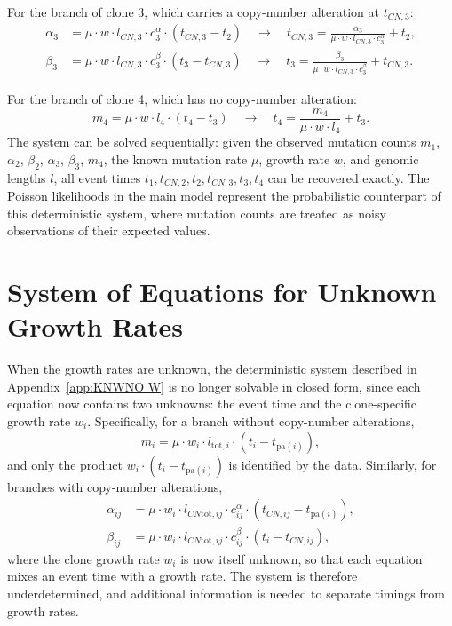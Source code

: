 For the branch of clone 3, which carries a copy-number alteration at $t_{CN,3}$:
%
\begin{align}
    \alpha_3 &= \mu \cdot w \cdot l_{CN,3} \cdot c^\alpha_3 
    \cdot (t_{CN,3} - t_2)
    \quad \longrightarrow \quad
    t_{CN,3} = \frac{\alpha_3}{\mu \cdot w \cdot l_{CN,3} \cdot c^\alpha_3} + t_2, 
    \\[4pt]
    \beta_3 &= \mu \cdot w \cdot l_{CN,3} \cdot c^\beta_3 
    \cdot (t_3 - t_{CN,3})
    \quad \longrightarrow \quad
    t_3 = \frac{\beta_3}{\mu \cdot w \cdot l_{CN,3} \cdot c^\beta_3} + t_{CN,3}.
\end{align}

For the branch of clone 4, which has no copy-number alteration:
%
\begin{equation}
    m_4 = \mu \cdot w \cdot l_4 \cdot (t_4 - t_3)
    \quad \longrightarrow \quad
    t_4 = \frac{m_4}{\mu \cdot w \cdot l_4} + t_3.
\end{equation}
%
The system can be solved sequentially: given the observed mutation counts 
$m_1$, $\alpha_2$, $\beta_2$, $\alpha_3$, $\beta_3$, $m_4$, the known mutation 
rate $\mu$, growth rate $w$, and genomic lengths $l$, all event times 
$t_1, t_{CN,2}, t_2, t_{CN,3}, t_3, t_4$ can be recovered exactly. The Poisson 
likelihoods in the main model represent the probabilistic counterpart of this 
deterministic system, where mutation counts are treated as noisy observations 
of their expected values.

\section{System of Equations for Unknown Growth Rates}
\label{app:RW}
\label{app:randomwalk}

When the growth rates are unknown, the deterministic system described in 
Appendix~\ref{app:KNWNO W} is no longer solvable in closed form, since each 
equation now contains two unknowns: the event time and the clone-specific growth 
rate $w_i$. Specifically, for a branch without copy-number alterations,
%
\begin{equation}
    m_i = \mu \cdot w_i \cdot l_{\mathrm{tot},i} \cdot (t_i - t_{\mathrm{pa}(i)}),
\end{equation}
%
and only the product $w_i \cdot (t_i - t_{\mathrm{pa}(i)})$ is identified by 
the data. Similarly, for branches with copy-number alterations,
%
\begin{align}
    \alpha_{ij} &= \mu \cdot w_i \cdot l_{CN\mathrm{tot},ij}
    \cdot c^\alpha_{ij} \cdot (t_{CN,ij} - t_{\mathrm{pa}(i)}), \\[4pt]
    \beta_{ij} &= \mu \cdot w_i \cdot l_{CN\mathrm{tot},ij} \cdot c^\beta_{ij} 
    \cdot (t_i - t_{CN,ij}),
\end{align}
%
where the clone growth rate $w_i$ is now itself unknown, so that each equation
mixes an event time with a growth rate. The system is therefore underdetermined,
and additional information is needed to separate timings from growth rates.

